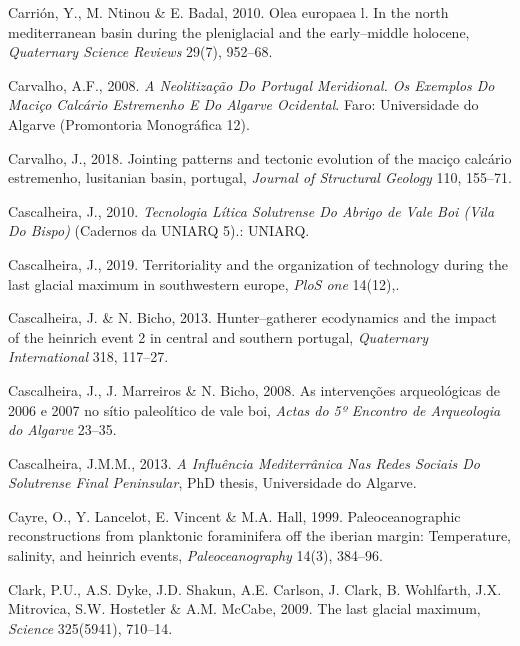 \documentclass[12pt,twoside]{reedthesis}
\begin{document}
\leavevmode\hypertarget{ref-carrion2010}{}%
Carrión, Y., M. Ntinou \& E. Badal, 2010. Olea europaea l. In the north mediterranean basin during the pleniglacial and the early--middle holocene, \emph{Quaternary Science Reviews} 29(7), 952--68.

\leavevmode\hypertarget{ref-carvalho2008}{}%
Carvalho, A.F., 2008. \emph{A Neolitização Do Portugal Meridional. Os Exemplos Do Maciço Calcário Estremenho E Do Algarve Ocidental}. Faro: Universidade do Algarve (Promontoria Monográfica 12).

\leavevmode\hypertarget{ref-carvalho2018}{}%
Carvalho, J., 2018. Jointing patterns and tectonic evolution of the maciço calcário estremenho, lusitanian basin, portugal, \emph{Journal of Structural Geology} 110, 155--71.

\leavevmode\hypertarget{ref-cascalheira2010}{}%
Cascalheira, J., 2010. \emph{Tecnologia Lítica Solutrense Do Abrigo de Vale Boi (Vila Do Bispo)} (Cadernos da UNIARQ 5).: UNIARQ.

\leavevmode\hypertarget{ref-cascalheira2019}{}%
Cascalheira, J., 2019. Territoriality and the organization of technology during the last glacial maximum in southwestern europe, \emph{PloS one} 14(12),.

\leavevmode\hypertarget{ref-cascalheiraandbicho2013}{}%
Cascalheira, J. \& N. Bicho, 2013. Hunter--gatherer ecodynamics and the impact of the heinrich event 2 in central and southern portugal, \emph{Quaternary International} 318, 117--27.

\leavevmode\hypertarget{ref-cascalheiraetal2008}{}%
Cascalheira, J., J. Marreiros \& N. Bicho, 2008. As intervenções arqueológicas de 2006 e 2007 no sítio paleolítico de vale boi, \emph{Actas do 5º Encontro de Arqueologia do Algarve} 23--35.

\leavevmode\hypertarget{ref-cascalheira2013}{}%
Cascalheira, J.M.M., 2013. \emph{\textup{A Influência Mediterrânica Nas Redes Sociais Do Solutrense Final Peninsular}}, PhD thesis, Universidade do Algarve.

\leavevmode\hypertarget{ref-cayre1999}{}%
Cayre, O., Y. Lancelot, E. Vincent \& M.A. Hall, 1999. Paleoceanographic reconstructions from planktonic foraminifera off the iberian margin: Temperature, salinity, and heinrich events, \emph{Paleoceanography} 14(3), 384--96.

\leavevmode\hypertarget{ref-clark2009}{}%
Clark, P.U., A.S. Dyke, J.D. Shakun, A.E. Carlson, J. Clark, B. Wohlfarth, J.X. Mitrovica, S.W. Hostetler \& A.M. McCabe, 2009. The last glacial maximum, \emph{Science} 325(5941), 710--14.
\end{document}
